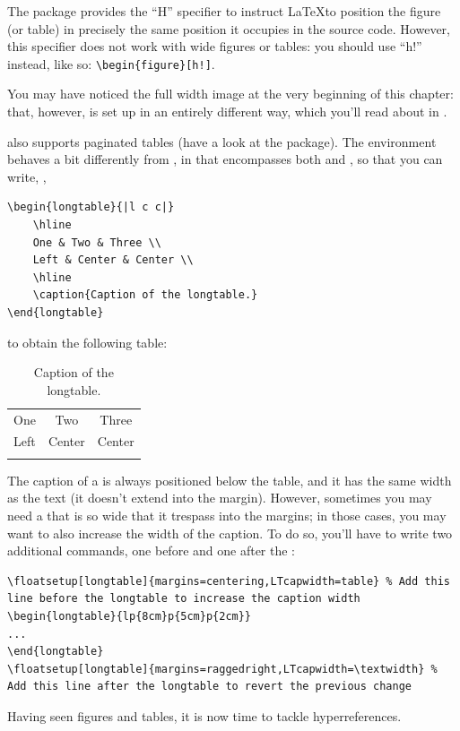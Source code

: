 The  package provides the \enquote{H} specifier to 
instruct \LaTeX to position the figure (or table) in precisely the same 
position it occupies in the source code. However, this specifier does 
not work with wide figures or tables: you should use \enquote{h!} 
instead, like so: \lstinline|\begin{figure}[h!]|.

You may have noticed the full width image at the very beginning of this
chapter: that, however, is set up in an entirely different way, which
you'll read about in .

 also supports paginated tables (have a look at the 
 package). The 
 environment behaves a bit differently from 
, in that  encompasses both 
 and , so that you can write, 
\eg,

\begin{lstlisting}[caption=Example of a longtable]
\begin{longtable}{|l c c|}
    \hline
    One & Two & Three \\
    Left & Center & Center \\
    \hline
    \caption{Caption of the longtable.}
\end{longtable}
\end{lstlisting}

to obtain the following table:
\begin{longtable}{|l c c|}
    \hline
    One & Two & Three \\
    Left & Center & Center \\
    \hline
    \caption{Caption of the longtable.}
\end{longtable}

The caption of a  is always positioned below the 
table, and it has the same width as the text (it doesn't extend into the 
margin). However, sometimes you may need a  that 
is so wide that it trespass into the margins; in those cases, you may 
want to also increase the width of the caption. To do so, you'll have to 
write two additional commands, one before and one after the 
:

\begin{lstlisting}[caption=Increasing the width of the caption of a \Environment{longtable}.]
\floatsetup[longtable]{margins=centering,LTcapwidth=table} % Add this line before the longtable to increase the caption width
\begin{longtable}{lp{8cm}p{5cm}p{2cm}}
...
\end{longtable}
\floatsetup[longtable]{margins=raggedright,LTcapwidth=\textwidth} % Add this line after the longtable to revert the previous change
\end{lstlisting}

Having seen figures and tables, it is now time to tackle 
hyperreferences.
